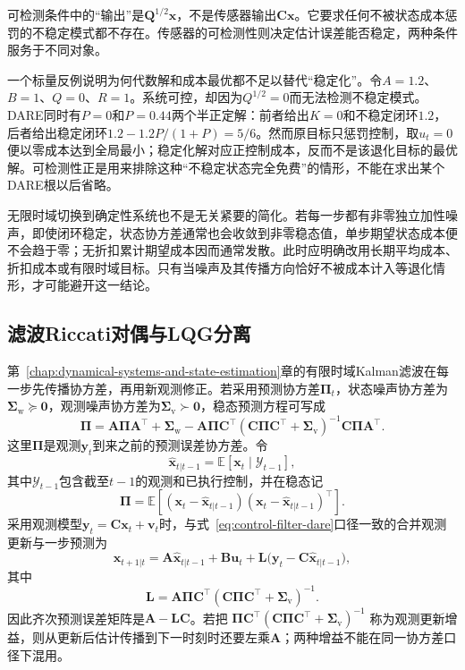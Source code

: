 可检测条件中的“输出”是$\bm{Q}^{1/2}\bm{x}$，不是传感器输出$\bm{C}\bm{x}$。它要求任何不被状态成本惩罚的不稳定模式都不存在。传感器的可检测性则决定估计误差能否稳定，两种条件服务于不同对象。

一个标量反例说明为何代数解和成本最优都不足以替代“稳定化”。令$A=1.2$、$B=1$、$Q=0$、$R=1$。系统可控，却因为$Q^{1/2}=0$而无法检测不稳定模式。DARE同时有$P=0$和$P=0.44$两个半正定解：前者给出$K=0$和不稳定闭环$1.2$，后者给出稳定闭环$1.2-1.2P/(1+P)=5/6$。然而原目标只惩罚控制，取$u_t=0$便以零成本达到全局最小；稳定化解对应正控制成本，反而不是该退化目标的最优解。可检测性正是用来排除这种“不稳定状态完全免费”的情形，不能在求出某个DARE根以后省略。

无限时域切换到确定性系统也不是无关紧要的简化。若每一步都有非零独立加性噪声，即使闭环稳定，状态协方差通常也会收敛到非零稳态值，单步期望状态成本便不会趋于零；无折扣累计期望成本因而通常发散。此时应明确改用长期平均成本、折扣成本或有限时域目标。只有当噪声及其传播方向恰好不被成本计入等退化情形，才可能避开这一结论。
\subsection{滤波Riccati对偶与LQG分离}
第~\ref{chap:dynamical-systems-and-state-estimation}章的有限时域Kalman滤波在每一步先传播协方差，再用新观测修正。若采用预测协方差$\bm{\Pi}_t$，状态噪声协方差为$\bm{\Sigma}_{\mathrm{w}}\succeq\bm{0}$，观测噪声协方差为$\bm{\Sigma}_{\mathrm{v}}\succ\bm{0}$，稳态预测方程可写成
\begin{equation}
  \bm{\Pi}
  =
  \bm{A}\bm{\Pi}\bm{A}^{\top}
  +\bm{\Sigma}_{\mathrm{w}}
  -
  \bm{A}\bm{\Pi}\bm{C}^{\top}
  (\bm{C}\bm{\Pi}\bm{C}^{\top}+\bm{\Sigma}_{\mathrm{v}})^{-1}
  \bm{C}\bm{\Pi}\bm{A}^{\top}.
  \label{eq:control-filter-dare}
\end{equation}
这里$\bm{\Pi}$是观测$\bm{y}_t$到来之前的预测误差协方差。令
\[
  \widehat{\bm{x}}_{t|t-1}
  =
  \mathbb{E}[\bm{x}_t\mid\mathcal{Y}_{t-1}],
\]
其中$\mathcal{Y}_{t-1}$包含截至$t-1$的观测和已执行控制，并在稳态记
\[
  \bm{\Pi}
  =
  \mathbb{E}\left[
    (\bm{x}_t-\widehat{\bm{x}}_{t|t-1})
    (\bm{x}_t-\widehat{\bm{x}}_{t|t-1})^{\top}
  \right].
\]
采用观测模型$\bm{y}_t=\bm{C}\bm{x}_t+\bm{v}_t$时，与式~\eqref{eq:control-filter-dare}口径一致的合并观测更新与一步预测为
\[
  \widehat{\bm{x}}_{t+1|t}
  =
  \bm{A}\widehat{\bm{x}}_{t|t-1}
  +\bm{B}\bm{u}_t
  +\bm{L}
  \bigl(
    \bm{y}_t-\bm{C}\widehat{\bm{x}}_{t|t-1}
  \bigr),
\]
其中
\[
  \bm{L}
  =
  \bm{A}\bm{\Pi}\bm{C}^{\top}
  (\bm{C}\bm{\Pi}\bm{C}^{\top}+\bm{\Sigma}_{\mathrm{v}})^{-1}.
\]
因此齐次预测误差矩阵是$\bm{A}-\bm{L}\bm{C}$。若把
$\bm{\Pi}\bm{C}^{\top}
(\bm{C}\bm{\Pi}\bm{C}^{\top}+\bm{\Sigma}_{\mathrm{v}})^{-1}$
称为观测更新增益，则从更新后估计传播到下一时刻时还要左乘$\bm{A}$；两种增益不能在同一协方差口径下混用。

